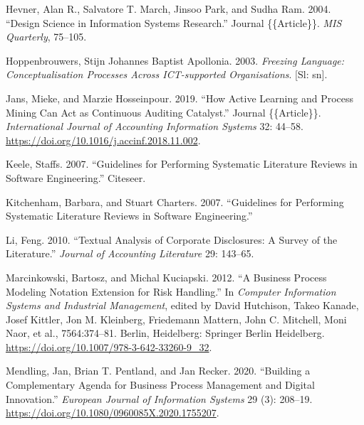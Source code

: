 \documentclass[
  letterpaper,
  DIV=11,
  numbers=noendperiod]{scrreprt}
\newlength{\cslhangindent}
\newlength{\cslentryspacingunit} %
\newenvironment{CSLReferences}[2] %
 {%
  \setlength{\parindent}{0pt}
  \ifodd #1
  \let\oldpar\par
  \def\par{\hangindent=\cslhangindent\oldpar}
  \fi
  \setlength{\parskip}{#2\cslentryspacingunit}
 }%
 {}
\begin{document}
\begin{CSLReferences}{1}{0}
\leavevmode{}%
Hevner, Alan R., Salvatore T. March, Jinsoo Park, and Sudha Ram. 2004.
{``Design Science in Information Systems Research.''} Journal
\{\{Article\}\}. \emph{MIS Quarterly}, 75--105.

\leavevmode{}%
Hoppenbrouwers, Stijn Johannes Baptist Apollonia. 2003. \emph{Freezing
Language: Conceptualisation Processes Across {ICT-supported}
Organisations}. {{[}Sl: sn{]}}.

\leavevmode{}%
Jans, Mieke, and Marzie Hosseinpour. 2019. {``How Active Learning and
Process Mining Can Act as {Continuous Auditing} Catalyst.''} Journal
\{\{Article\}\}. \emph{International Journal of Accounting Information
Systems} 32: 44--58. \url{https://doi.org/10.1016/j.accinf.2018.11.002}.

\leavevmode{}%
Keele, Staffs. 2007. {``Guidelines for Performing Systematic Literature
Reviews in Software Engineering.''} {Citeseer}.

\leavevmode{}%
Kitchenham, Barbara, and Stuart Charters. 2007. {``Guidelines for
Performing Systematic Literature Reviews in Software Engineering.''}

\leavevmode{}%
Li, Feng. 2010. {``Textual {Analysis} of {Corporate Disclosures}: {A
Survey} of the {Literature}.''} \emph{Journal of Accounting Literature}
29: 143--65.

\leavevmode{}%
Marcinkowski, Bartosz, and Michal Kuciapski. 2012. {``A {Business
Process Modeling Notation Extension} for {Risk Handling}.''} In
\emph{Computer {Information Systems} and {Industrial Management}},
edited by David Hutchison, Takeo Kanade, Josef Kittler, Jon M.
Kleinberg, Friedemann Mattern, John C. Mitchell, Moni Naor, et al.,
7564:374--81. {Berlin, Heidelberg}: {Springer Berlin Heidelberg}.
\url{https://doi.org/10.1007/978-3-642-33260-9_32}.

\leavevmode{}%
Mendling, Jan, Brian T. Pentland, and Jan Recker. 2020. {``Building a
Complementary Agenda for Business Process Management and Digital
Innovation.''} \emph{European Journal of Information Systems} 29 (3):
208--19. \url{https://doi.org/10.1080/0960085X.2020.1755207}.


\end{CSLReferences}
\end{document}
